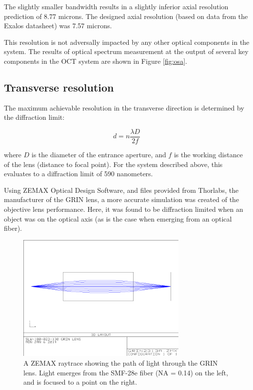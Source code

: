 The slightly smaller bandwidth results in a slightly inferior axial resolution prediction of 8.77 microns. The designed axial resolution (based on data from the Exalos datasheet) was 7.57 microns.

This resolution is not adversally impacted by any other optical components in the system. The results of optical spectrum measurement at the output of several key components in the OCT system are shown in Figure \ref{fig:osa}.


\subsection{Transverse resolution}
\label{sec:transverse_res}

The maximum achievable resolution in the transverse direction is determined by the diffraction limit:

\begin{equation} \label{eq:tres2}
d = n\frac{\lambda D}{2f}
\end{equation}

where $D$ is the diameter of the entrance aperture, and $f$ is the working distance of the lens (distance to focal point). For the system described above, this evaluates to a diffraction limit of 590 nanometers.

Using ZEMAX Optical Design Software, and files provided from Thorlabs, the manufacturer of the GRIN lens, a more accurate simulation was created of the objective lens performance. Here, it was found to be diffraction limited when an object was on the optical axis (as is the case when emerging from an optical fiber).

\begin{figure}[h!]
\centering
\includegraphics[width=0.75\textwidth]{Images/Zemax/GRO-raytrace.png}
\caption{A ZEMAX raytrace showing the path of light through the GRIN lens. Light emerges from the SMF-28e fiber (NA = 0.14) on the left, and is focused to a point on the right.}
\end{figure}

